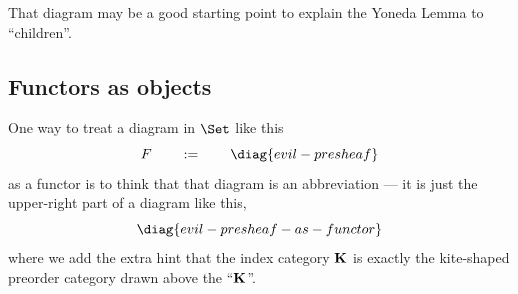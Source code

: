 \documentclass[oneside,12pt]{article}
\begin{document}
That diagram may be a good starting point to explain the Yoneda Lemma
to ``children''.




%                                                                         




\subsection{Functors as objects \DONE}
\label{functors-as-objects}

One way to treat a diagram in $\Set$ like this
%
\pu
$$
  F \qquad := \qquad \diag{evil-presheaf}
$$
%
as a functor is to think that that diagram is an abbreviation --- it
is just the upper-right part of a diagram like this,
%
\pu
%
$$\pu
  \diag{evil-presheaf-as-functor}
$$
%
where we add the extra hint that the index category $\mathbf{K}$ is exactly
the kite-shaped preorder category drawn above the ``$\mathbf{K}$''.
\end{document}
